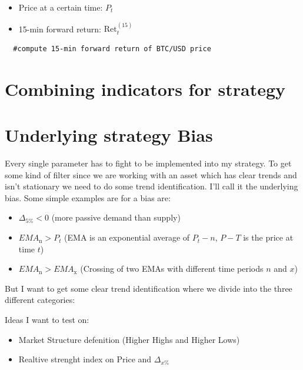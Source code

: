 \documentclass[12pt]{article}
\begin{document}
\begin{itemize}
  \item Price at a certain time: \space $P_t$
  \item 15-min forward return: \space $\mathrm{Ret}^{(15)}_t$
\end{itemize}





\begin{verbatim}
  #compute 15-min forward return of BTC/USD price
\end{verbatim}




\newpage


\section{Combining indicators for strategy}


\newpage
\section*{Underlying strategy Bias}

Every single parameter has to fight to be implemented into my strategy. To get some kind of filter since we are working with an asset which has clear trends and isn't stationary we need to do some trend identification.  
I'll call it the underlying bias. Some simple examples are for a bias are:
\begin{itemize}
  \item $\Delta_{5\%} < 0$ (more passive demand than supply)
  \item $EMA_{\text{n}} > P_t$ (EMA is an exponential average of $P_t-n$, $P-T$ is the price at time $t$)
  \item $EMA_{\text{n}} >EMA_{\text{x}}$ (Crossing of two EMAs with different time periods $n$ and $x$)
\end{itemize}

But I want to get some clear trend identification where we divide into the three different categories:


Ideas I want to test on:

\begin{itemize}
  \item Market Structure defenition (Higher Highs and Higher Lows)
  \item Realtive strenght index on Price and $\Delta_{x\%}$
  
  
\end{itemize}
\newpage
\end{document}
